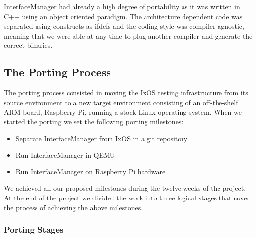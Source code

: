 InterfaceManager had already a high degree of portability as it was written
in C++ using an object oriented paradigm. The architecture dependent code was
separated using constructs as ifdefs and the coding style was compiler agnostic,
meaning that we were able at any time to plug another compiler and generate the
correct binaries.

\subsection{The Porting Process}

The porting process consisted in moving the IxOS testing infrastructure from its
source environment to a new target environment consisting of an off-the-shelf
ARM board, Raspberry Pi, running a stock Linux operating system. When we started
the porting we set the following porting milestones:
\begin{itemize}
    \item Separate InterfaceManager from IxOS in a git repository
    \item Run InterfaceManager in QEMU
    \item Run InterfaceManager on Raspberry Pi hardware
\end{itemize}
We achieved all our proposed milestones during the twelve weeks of the project.
At the end of the project we divided the work into three logical stages
that cover the process of achieving the above milestones.

\subsubsection{Porting Stages}

